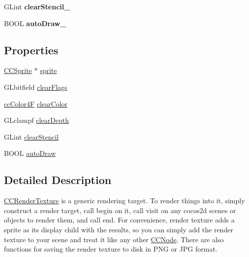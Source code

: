 \begin{DoxyCompactItemize}
\item 
\hypertarget{class_c_c_render_texture_adc22d39ac3c15e19cd5e83edb4fd12d8}{G\-Lint {\bfseries clear\-Stencil\-\_\-}}\label{class_c_c_render_texture_adc22d39ac3c15e19cd5e83edb4fd12d8}

\item 
\hypertarget{class_c_c_render_texture_a5de9a5e87fc4b9439ab495ef834ab2e8}{B\-O\-O\-L {\bfseries auto\-Draw\-\_\-}}\label{class_c_c_render_texture_a5de9a5e87fc4b9439ab495ef834ab2e8}

\end{DoxyCompactItemize}
\subsection*{Properties}
\begin{DoxyCompactItemize}
\item 
\hyperlink{class_c_c_sprite}{C\-C\-Sprite} $\ast$ \hyperlink{class_c_c_render_texture_a1e77dcd25e60ceb47d423854eab9c2b7}{sprite}
\item 
G\-Lbitfield \hyperlink{class_c_c_render_texture_af0a421c5fee6668cbfbb8386d002af41}{clear\-Flags}
\item 
\hyperlink{cc_types_8h_aecc18290defe020343f1d7bb2ee73145}{cc\-Color4\-F} \hyperlink{class_c_c_render_texture_acd634a88dca082fc15cec37b06aac438}{clear\-Color}
\item 
G\-Lclampf \hyperlink{class_c_c_render_texture_af79356a17a6760f9f6167d5444cf6b77}{clear\-Depth}
\item 
G\-Lint \hyperlink{class_c_c_render_texture_a715880e5dc695f243e3ce08b3f8dd09d}{clear\-Stencil}
\item 
B\-O\-O\-L \hyperlink{class_c_c_render_texture_a74d13404d368796b39f69f320faee52b}{auto\-Draw}
\end{DoxyCompactItemize}


\subsection{Detailed Description}
\hyperlink{class_c_c_render_texture}{C\-C\-Render\-Texture} is a generic rendering target. To render things into it, simply construct a render target, call begin on it, call visit on any cocos2d scenes or objects to render them, and call end. For convenience, render texture adds a sprite as its display child with the results, so you can simply add the render texture to your scene and treat it like any other \hyperlink{class_c_c_node}{C\-C\-Node}. There are also functions for saving the render texture to disk in P\-N\-G or J\-P\-G format.

